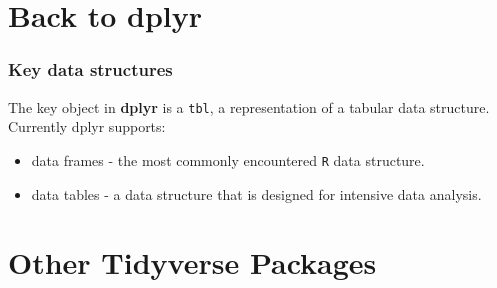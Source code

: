 \documentclass{beamer}
\begin{document}
\section{Back to dplyr}
\begin{frame}
	\frametitle{Key data structures}
	\LARGE
	The key object in \textbf{dplyr} is a \texttt{tbl}, a representation of a tabular data structure. Currently dplyr supports:
	
	\begin{itemize}
		\item data frames - the  most commonly encountered \texttt{R} data structure. 
		\item data tables - a data structure that is designed for intensive data analysis.
	\end{itemize}
	
\end{frame}
\section{Other Tidyverse Packages}
\end{document}
